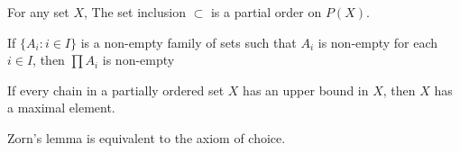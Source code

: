 	\begin{remark}
		For any set $X$, The set inclusion $\subset$ is a partial order on $P(X)$.
	\end{remark}
	\begin{axiom}[Choice]
		If $\{A_i : i \in I\}$ is a non-empty family of sets such that $A_i$ is non-empty for each $i \in I$, then $\prod A_i$ is non-empty
	\end{axiom}
	\begin{lemma}[Zorn]
		If every chain in a partially ordered set $X$ has an upper bound in $X$, then $X$ has a maximal element.
	\end{lemma}
	\begin{remark}
		Zorn's lemma is equivalent to the axiom of choice.\cite{alip1}
	\end{remark}

